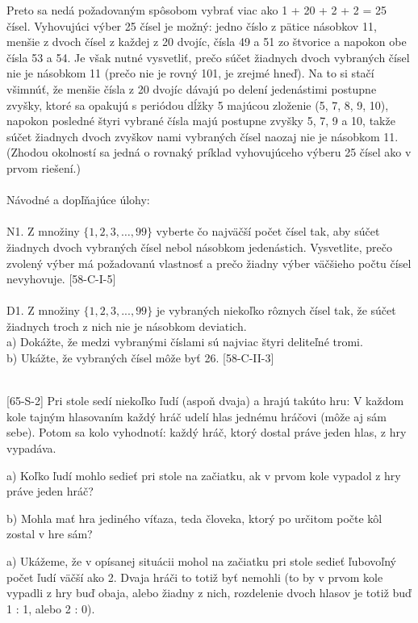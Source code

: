 Preto sa nedá požadovaným spôsobom vybrať viac ako 1 + 20 + 2 + 2 = 25 čísel. Vyhovujúci výber 25 čísel je možný: jedno číslo z pätice násobkov 11, menšie z dvoch čísel z každej z 20 dvojíc, čísla 49 a 51 zo štvorice a napokon obe čísla 53 a 54. Je však nutné vysvetliť, prečo súčet žiadnych dvoch vybraných čísel nie je násobkom 11 (prečo nie je rovný 101, je zrejmé hneď). Na to si stačí všimnúť, že menšie čísla z 20 dvojíc dávajú po delení jedenástimi postupne zvyšky, ktoré sa opakujú s periódou dĺžky 5 majúcou zloženie (5, 7, 8, 9, 10), napokon posledné štyri vybrané čísla majú postupne zvyšky 5, 7, 9 a 10, takže súčet žiadnych dvoch zvyškov nami vybraných čísel naozaj nie je násobkom 11. (Zhodou okolností sa jedná o rovnaký príklad vyhovujúceho výberu 25 čísel ako v prvom riešení.)\\
\\
Návodné a dopľňajúce úlohy:\\
\\
N1. Z množiny $\{1, 2, 3, \ldots , 99\}$ vyberte čo najväčší počet čísel tak, aby súčet žiadnych dvoch vybraných čísel nebol násobkom jedenástich. Vysvetlite, prečo zvolený výber má požadovanú vlastnosť a prečo žiadny výber väčšieho počtu čísel nevyhovuje. [58-C-I-5]\\
\\
D1. Z množiny $\{1, 2, 3, . . . , 99\}$ je vybraných niekoľko rôznych čísel tak, že súčet žiadnych troch z nich nie je násobkom deviatich.\\
a) Dokážte, že medzi vybranými číslami sú najviac štyri deliteľné tromi.\\
b) Ukážte, že vybraných čísel môže byť 26. [58-C-II-3]\\
\\
\begin{tcolorbox}[breakable,notitle,boxrule=0pt,colback=light-gray,colframe=light-gray]\ul [65-S-2]
Pri stole sedí niekoľko ľudí (aspoň dvaja) a hrajú takúto hru: V každom kole tajným hlasovaním každý hráč udelí hlas jednému hráčovi (môže aj sám sebe). Potom sa kolo vyhodnotí: každý hráč, ktorý dostal práve jeden hlas, z hry vypadáva.

a) Koľko ľudí mohlo sedieť pri stole na začiatku, ak v prvom kole vypadol z hry práve jeden hráč?

b) Mohla mať hra jediného víťaza, teda človeka, ktorý po určitom počte kôl zostal v hre sám?

\end{tcolorbox}

\rieh a) Ukážeme, že v opísanej situácii mohol na začiatku pri stole sedieť ľubovoľný počet ľudí väčší ako 2. Dvaja hráči to totiž byť nemohli (to by v prvom kole vypadli z hry buď obaja, alebo žiadny z nich, rozdelenie dvoch hlasov je totiž buď 1 : 1, alebo 2 : 0).

